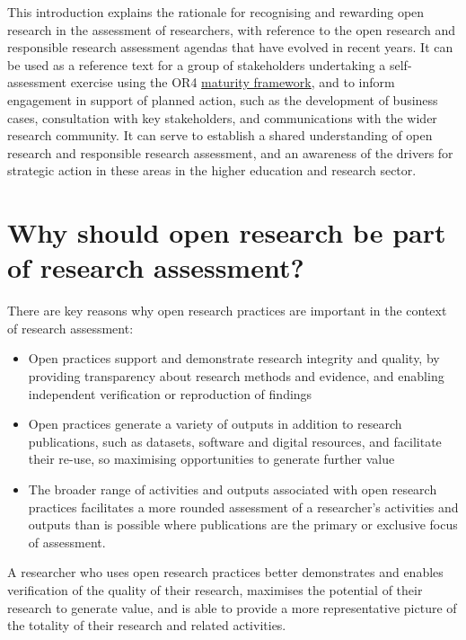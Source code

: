 \documentclass[
  letterpaper,
  DIV=11,
  numbers=noendperiod,
  oneside]{scrreprt}
\begin{document}
This introduction explains the rationale for recognising and rewarding
open research in the assessment of researchers, with reference to the
open research and responsible research assessment agendas that have
evolved in recent years. It can be used as a reference text for a group
of stakeholders undertaking a self-assessment exercise using the OR4
\href{maturity-framework.qmd}{maturity framework}, and to inform
engagement in support of planned action, such as the development of
business cases, consultation with key stakeholders, and communications
with the wider research community. It can serve to establish a shared
understanding of open research and responsible research assessment, and
an awareness of the drivers for strategic action in these areas in the
higher education and research sector.

\section{Why should open research be part of research
assessment?}\label{why-should-open-research-be-part-of-research-assessment}

There are key reasons why open research practices are important in the
context of research assessment:

\begin{itemize}
\item
  Open practices support and demonstrate research integrity and quality,
  by providing transparency about research methods and evidence, and
  enabling independent verification or reproduction of findings
\item
  Open practices generate a variety of outputs in addition to research
  publications, such as datasets, software and digital resources, and
  facilitate their re-use, so maximising opportunities to generate
  further value
\item
  The broader range of activities and outputs associated with open
  research practices facilitates a more rounded assessment of a
  researcher's activities and outputs than is possible where
  publications are the primary or exclusive focus of assessment.
\end{itemize}

A researcher who uses open research practices better demonstrates and
enables verification of the quality of their research, maximises the
potential of their research to generate value, and is able to provide a
more representative picture of the totality of their research and
related activities.
\end{document}
